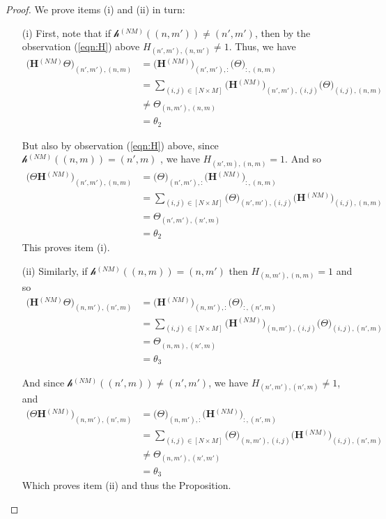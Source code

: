\documentclass{article}
\newcommand{\mat}[1]{\ensuremath{\mathbf{#1}}}
\newcommand{\gr}[1]{\ensuremath{\mathcal{#1}}}
\newcommand{\prm}[1]{\ensuremath{^{(#1)}}}
\newcommand{\grn}[2]{\ensuremath{\gr{#1}\prm{#2}}}
\theoremstyle{definition}
\newtheorem*{proof}{Proof}%
\begin{document}
\begin{proof}
  We prove items (i) and (ii) in turn:
  \begin{enumerate}
  
  
    \item[(i)] First, note that if $\grn{h}{NM}((n, m')) \neq (n', m')$, then by the observation (\ref{eqn:H}) above $H_{(n',m'), (n,m')} \neq 1$. Thus, we have
      \begin{align*}
        \big( \mat{H}\prm{N M} \Theta \big)_{(n',m'), (n,m)} &= \big(\mat{H}\prm{N M}\big)_{(n',m'),:} \big(\Theta \big)_{:,(n,m)} \\
        &= \sum_{(i,j) \in [N \times M]} \big(\mat{H}\prm{N M}\big)_{(n',m'),(i,j)} \big(\Theta \big)_{(i,j),(n,m)} \\
        &\neq \Theta_{(n,m'),(n,m)} \\
        &= \theta_2
      \end{align*}
      
      But also by observation (\ref{eqn:H}) above, since $\grn{h}{NM}((n, m)) = (n', m)$ , we have $H_{(n',m), (n,m)} = 1$. And so
      \begin{align*}
        \big(\Theta \mat{H}\prm{N M} \big)_{(n',m'), (n,m)} &= \big(\Theta \big)_{(n',m'), :} \big(\mat{H}\prm{N M} \big)_{:, (n,m)} \\
        &= \sum_{(i,j) \in [N \times M]} \big(\Theta \big)_{(n',m'), (i,j)} \big(\mat{H}\prm{N M} \big)_{(i,j), (n,m)} \\
        &= \Theta_{(n', m'), (n', m)} \\
        &= \theta_2
       \end{align*}
    This proves item (i). 
    
    
    
    
    \item[(ii)]
      Similarly, if $\grn{h}{NM}((n, m)) = (n, m')$ then $H_{(n,m'), (n,m)} = 1$ and so
      \begin{align*}
        \big( \mat{H}\prm{N M} \Theta \big)_{(n,m'), (n',m)} &= \big(\mat{H}\prm{N M}\big)_{(n,m'),:} \big(\Theta \big)_{:,(n',m)} \\
        &= \sum_{(i,j) \in [N \times M]} \big(\mat{H}\prm{N M}\big)_{(n,m'),(i,j)} \big(\Theta \big)_{(i,j),(n',m)} \\
        &= \Theta_{(n,m), (n',m)} \\
        &= \theta_3
      \end{align*}
      
        And since $\grn{h}{NM}((n', m)) \neq (n', m')$, we have $H_{(n',m'), (n',m)} \neq 1$, and 
      \begin{align*}
         \big(\Theta \mat{H}\prm{N M} \big)_{(n,m'), (n',m)} &= \big(\Theta \big)_{(n,m'), :} \big(\mat{H}\prm{N M} \big)_{:, (n',m)} \\
         &= \sum_{(i,j) \in [N \times M]} \big(\Theta \big)_{(n,m'), (i,j)} \big(\mat{H}\prm{N M} \big)_{(i,j), (n',m)} \\
         &\neq \Theta_{(n,m'), (n',m')} \\
         &= \theta_3
      \end{align*}
      Which proves item (ii) and thus the Proposition. 
   \end{enumerate}
   

\end{proof}
\end{document}
